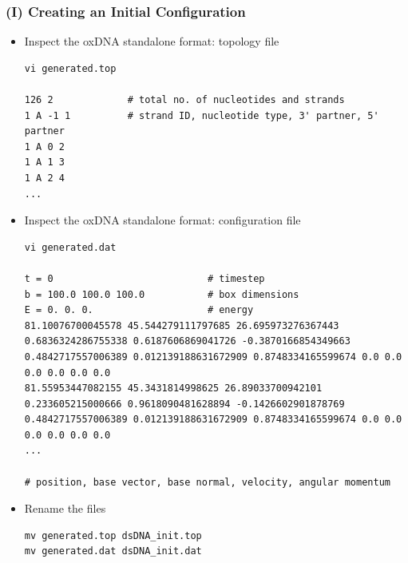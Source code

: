 \documentclass[slidestop,compress,9pt]{beamer}
\begin{document}
\begin{frame}[fragile]
\frametitle{(I) Creating an Initial Configuration}
\small

\begin{itemize}
\item Inspect the oxDNA standalone format: topology file
\linespread{0.4}
\begin{lstlisting}
vi generated.top

126 2             # total no. of nucleotides and strands
1 A -1 1          # strand ID, nucleotide type, 3' partner, 5' partner
1 A 0 2
1 A 1 3
1 A 2 4
...
\end{lstlisting}


\item Inspect the oxDNA standalone format: configuration file
\begin{lstlisting}
vi generated.dat

t = 0                           # timestep
b = 100.0 100.0 100.0           # box dimensions
E = 0. 0. 0.                    # energy 
81.10076700045578 45.544279111797685 26.695973276367443 0.6836324286755338 0.6187606869041726 -0.3870166854349663 0.4842717557006389 0.012139188631672909 0.8748334165599674 0.0 0.0 0.0 0.0 0.0 0.0
81.55953447082155 45.3431814998625 26.89033700942101 0.233605215000666 0.9618090481628894 -0.1426602901878769 0.4842717557006389 0.012139188631672909 0.8748334165599674 0.0 0.0 0.0 0.0 0.0 0.0
...

# position, base vector, base normal, velocity, angular momentum
\end{lstlisting}

\item Rename the files
\begin{lstlisting}
mv generated.top dsDNA_init.top
mv generated.dat dsDNA_init.dat
\end{lstlisting}

\end{itemize}

\end{frame}
\end{document}
